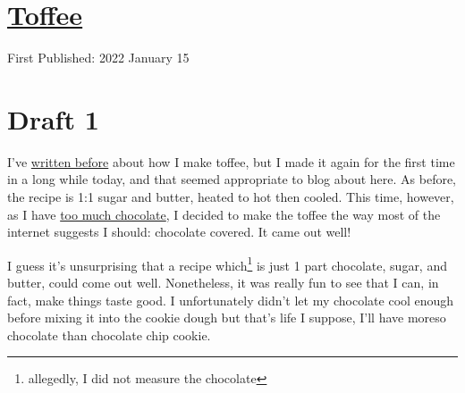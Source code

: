 \documentclass[12pt]{article}[titlepage]
\newcommand{\1}{\={a}}
\newcommand{\2}{\={e}}
\newcommand{\3}{\={\i}}
\newcommand{\4}{\=o}
\newcommand{\5}{\=u}
\newcommand{\6}{\={A}}
\renewcommand{\,}{\textsuperscript{,}}
\begin{document}
\doublespacing
\section{\href{toffee.html}{Toffee}}
First Published: 2022 January 15

\section{Draft 1}
I've \href{toffee-recipe.html}{written before} about how I make toffee, but I made it again for the first time in a long while today, and that seemed appropriate to blog about here.
As before, the recipe is 1:1 sugar and butter, heated to hot then cooled.
This time, however, as I have \href{candied-orange.html}{too much chocolate}, I decided to make the toffee the way most of the internet suggests I should: chocolate covered.
It came out well!

I guess it's unsurprising that a recipe which\footnote{allegedly, I did not measure the chocolate} is just 1 part chocolate, sugar, and butter, could come out well.
Nonetheless, it was really fun to see that I can, in fact, make things taste good.
I unfortunately didn't let my chocolate cool enough before mixing it into the cookie dough but that's life I suppose, I'll have moreso chocolate than chocolate chip cookie.
\end{document}

